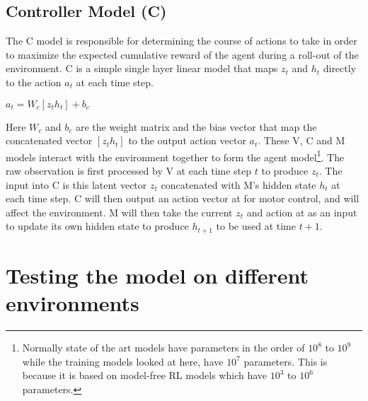 \documentclass[a4paper]{article}
\begin{document}
\subsection{Controller Model (C)}
The C model is responsible for determining the course of actions to take in order to maximize the expected cumulative reward of the agent during a roll-out of the environment. C is a simple single layer linear model that maps $z_t$ and $h_t$ directly to the action $a_t$ at each time step.
\begin{center}
$a_t = W_c[z_t h_t] + b_c$ 
\end{center}
Here $W_c$ and $b_c$ are the weight matrix and the bias vector that map the concatenated vector $[z_t h_t]$ to the output action vector $a_t$.
\newline
\newline
\newline
\newline
These V, C and M models interact with the environment together to form the agent model\footnote{\label{myfootnote}Normally state of the art models have parameters in the order of $10^8$ to $10^9$ while the training models looked at here, have $10^7$ parameters. This is because it is based on model-free RL models which have $10^3$ to $10^6$ parameters.}. The raw observation is first processed by V at each time step $t$ to produce $z_t$. The input into C is this latent vector $z_t$ concatenated with M’s hidden state $h_t$ at each time step. C will then output an action vector at for motor control, and will affect the environment. M will then take the current $z_t$ and action at as an input to update its own hidden state to produce $h_{t+1}$ to be used at time $t + 1$. 
\newline
\newline
\newline
\section{Testing the model on different environments}
\end{document}
